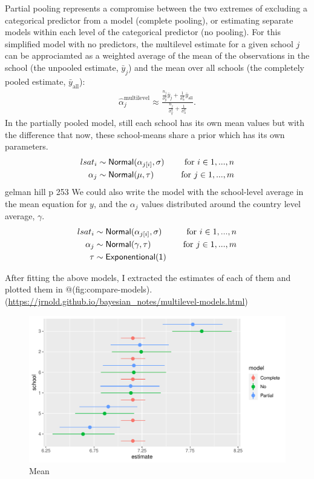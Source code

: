 \documentclass[a4, 12pt]{article}
\begin{document}
Partial pooling represents a compromise between the two extremes of excluding a categorical predictor from a model (complete pooling), or estimating separate models within each level of the categorical predictor (no pooling). For this simplified model with no predictors, the multilevel estimate for a given school \(j\) can be approciamted as a weighted average of the mean of the observations in the school (the unpooled estimate, \(\bar{y}_j\)) and the mean over all schools (the completely pooled estimate, \(\bar{y}_{\mathrm {all}}\)):
\begin{align*}
\hat{\alpha}_j^{\mathrm {multilevel}} \approx \frac {\frac{n_j}{\sigma_y^2}\bar y_j + \frac {1}{\sigma_{\alpha}^2}\bar y_{\mathrm {all}}}{\frac {n_j}{\sigma_y^2} + \frac {1}{\sigma_{\alpha}^2}}.
\end{align*}
In the partially pooled model, still each school has its own mean values but with the difference that now, these school-means share a prior which has its own parameters.
\begin{align*}
lsat_i & \sim {\sf Normal} (\alpha_{j[i]}, \sigma) & \quad \text{for } i \in 1,...,n \\
\alpha_{j} & \sim {\sf Normal} (\mu, \tau) & \quad \text{for } j \in 1,...,m
\end{align*} gelman hill p 253
We could also write the model with the school-level average in the mean equation for \(y\), and the \(\alpha_j\) values distributed around the country level average, \(\gamma\).
\begin{align*}
lsat_i & \sim {\sf Normal} (\alpha_{j[i]}, \sigma) & \quad \text{for } i \in 1,...,n \\
\alpha_{j} & \sim {\sf Normal} (\gamma, \tau) & \quad \text{for } j \in 1,...,m \\
\tau & \sim {\sf Exponentional(1)}
\end{align*}

After fitting the above models, I extracted the estimates of each of them and plotted them in @(fig:compare-models). (\url{https://jrnold.github.io/bayesian_notes/multilevel-models.html})

\begin{figure}[H]

{\centering \includegraphics[width=0.8\linewidth,]{../figures/compare_models} 

}

\caption{Mean}\label{fig:compare-models}
\end{figure}
\end{document}
